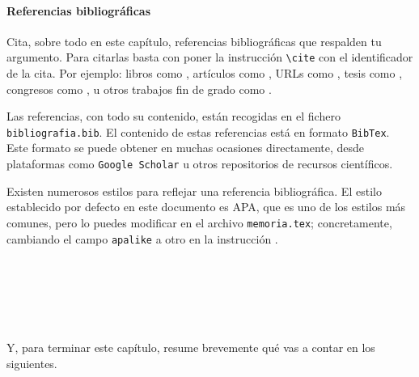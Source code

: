 \paragraph{Referencias bibliográficas}
\label{sec:referencias}

Cita, sobre todo en este capítulo, referencias bibliográficas que respalden tu argumento. Para citarlas basta con poner la instrucción \verb|\cite| con el identificador de la cita. Por ejemplo: libros como \cite{vega12e}, artículos como \cite{vega19b}, URLs como \cite{vega19a}, tesis como \cite{vega18b}, congresos como \cite{vega18a}, u otros trabajos fin de grado como \cite{vega08b}.

Las referencias, con todo su contenido, están recogidas en el fichero \texttt{bibliografia.bib}. El contenido de estas referencias está en formato \texttt{BibTex}. Este formato se puede obtener en muchas ocasiones directamente, desde plataformas como \texttt{Google Scholar} u otros repositorios de recursos científicos.

Existen numerosos estilos para reflejar una referencia bibliográfica. El estilo establecido por defecto en este documento es APA, que es uno de los estilos más comunes, pero lo puedes modificar en el archivo \texttt{memoria.tex}; concretamente, cambiando el campo \verb|apalike| a otro en la instrucción \verb||. 

\

\

\

Y, para terminar este capítulo, resume brevemente qué vas a contar en los siguientes.
